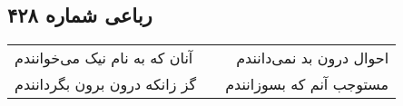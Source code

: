 \begin{center}
\section*{رباعی شماره ۴۲۸}
\label{sec:sh428}
\begin{longtable}{l p{0.5cm} r}
آنان که به نام نیک می‌خوانندم
&&
احوال درون بد نمی‌دانندم
\\
گز زانکه درون برون بگردانندم
&&
مستوجب آنم که بسوزانندم
\\
\end{longtable}
\end{center}
